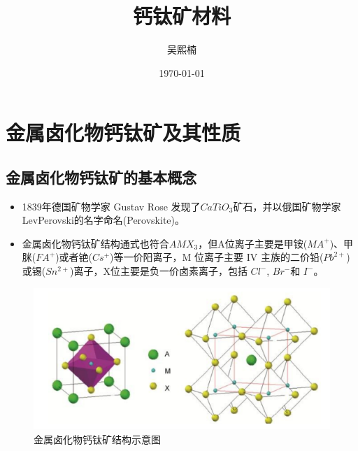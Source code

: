 \documentclass{beamer}[fontset=windows]
\author{吴熙楠}
\title{钙钛矿材料}
\institute{北京大学物理学院}
\date{\today}
\begin{document}
	
	\kaishu
	\begin{frame}
		\titlepage
	\end{frame}
	
	\begin{frame}
		\tableofcontents[sectionstyle=show,subsectionstyle=show/shaded/hide,subsubsectionstyle=show/shaded/hide]
	\end{frame}
\section{金属卤化物钙钛矿及其性质}
\subsection{金属卤化物钙钛矿的基本概念}
\begin{frame}
	\begin{itemize}
		\item 1839年德国矿物学家 Gustav Rose 发现了$ CaTiO_{3}$矿石，并以俄国矿物学家 LevPerovski的名字命名(Perovskite)。
		\item 金属卤化物钙钛矿结构通式也符合$AMX_{3}$，但A位离子主要是甲铵($MA^{+}$)、甲脒($FA^{+}$)或者铯($Cs^{+}$)等一价阳离子，M 位离子主要 IV 主族的二价铅($Pb^{2+}$)或锡($Sn^{2+}$)离子，X位主要是负一价卤素离子，包括 $Cl^{-}$, $Br^{-}$和 $I^{-}$。
	\end{itemize}
	\begin{figure}[H]
	\centering
	\hspace{2em}\includegraphics[width=.65\linewidth]{pic/1.png}
	\caption{金属卤化物钙钛矿结构示意图
	}
\end{figure}
\end{frame}
\end{document}
